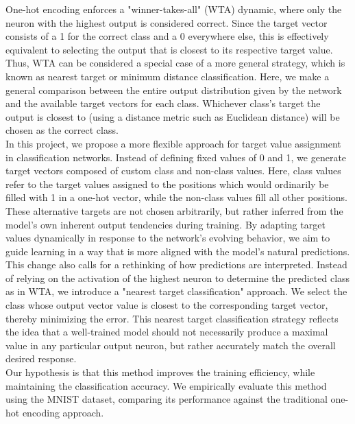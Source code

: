\documentclass[12pt,fleqn,a4paper]{article}
\begin{document}
One-hot encoding enforces a "winner-takes-all" (WTA) dynamic, where only the neuron with the highest output is considered correct. Since the target vector consists of a 1 for the correct class and a 0 everywhere else, this is effectively equivalent to selecting the output that is closest to its respective target value. Thus, WTA can be considered a special case of a more general strategy, which is known as nearest target or minimum distance classification. Here, we make a general comparison between the entire output distribution given by the network and the available target vectors for each class. Whichever class's target the output is closest to (using a distance metric such as Euclidean distance) will be chosen as the correct class. \\

In this project, we propose a more flexible approach for target value assignment in classification networks. Instead of defining fixed values of 0 and 1, we generate target vectors composed of custom class and non-class values. Here, class values refer to the target values assigned to the positions which would ordinarily be filled with 1 in a one-hot vector, while the non-class values fill all other positions. These alternative targets are not chosen arbitrarily, but rather inferred from the model's own inherent output tendencies during training. By adapting target values dynamically in response to the network's evolving behavior, we aim to guide learning in a way that is more aligned with the model's natural predictions. \\

This change also calls for a rethinking of how predictions are interpreted. Instead of relying on the activation of the highest neuron to determine the predicted class as in WTA, we introduce a "nearest target classification" approach. We select the class whose output vector value is closest to the corresponding target vector, thereby minimizing the error. This nearest target classification strategy reflects the idea that a well-trained model should not necessarily produce a maximal value in any particular output neuron, but rather accurately match the overall desired response. \\

Our hypothesis is that this method improves the training efficiency, while maintaining the classification accuracy. We empirically evaluate this method using the MNIST dataset, comparing its performance against the traditional one-hot encoding approach. \\
\end{document}
